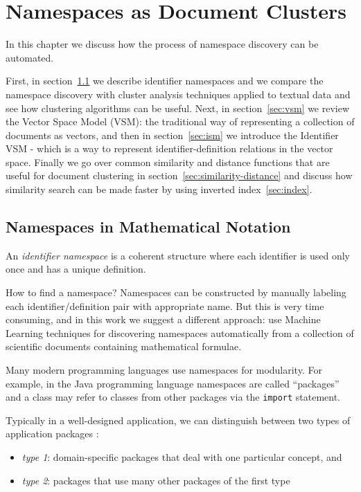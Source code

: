 \section{Namespaces as Document Clusters}


In this chapter we discuss how the process of namespace discovery
can be automated.

First, in section~\ref{sec:namespaces} we describe identifier namespaces and
we compare the namespace discovery with cluster analysis techniques
applied to textual data and see how clustering algorithms can be
useful. Next, in section~\ref{sec:vsm}
we review the Vector Space Model (VSM): the traditional way of
representing a collection of documents as vectors, and then in
section~\ref{sec:ism} we introduce the Identifier VSM - which
is a way to represent identifier-definition relations in the
vector space. Finally we go over common similarity and distance
functions that are useful for document clustering in
section~\ref{sec:similarity-distance} and discuss how similarity
search can be made faster by using inverted index~\ref{sec:index}.



\subsection{Namespaces in Mathematical Notation} \label{sec:namespaces}

An \emph{identifier namespace} is a coherent structure where
each identifier is used only once and has a unique definition.

How to find a namespace? Namespaces can be constructed by
manually labeling each identifier/definition pair with appropriate
name. But this is very time consuming, and in this work we suggest
a different approach: use Machine Learning techniques for
discovering namespaces automatically from a collection of scientific
documents containing mathematical formulae.


Many modern programming languages use namespaces for modularity.
For example, in the Java programming language \cite{gosling2014java}
namespaces are called ``packages'' and
a class may refer to classes from other packages via the \texttt{import}
statement.



Typically in a well-designed application, we can distinguish between
two types of application packages \cite{evans2004domain}:

\begin{itemize}
  \item \emph{type 1}: domain-specific packages that deal with one particular concept, and
  \item \emph{type 2}: packages that use many other packages of the first type
\end{itemize}



